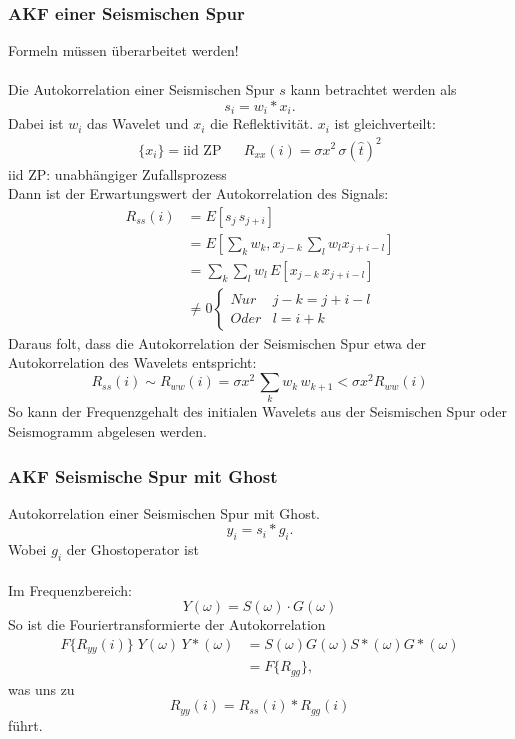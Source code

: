 \subsubsection*{AKF einer Seismischen Spur}
{\color{red}Formeln müssen überarbeitet werden!}\\\\
Die Autokorrelation einer Seismischen Spur $s$ kann betrachtet werden als
\[
s_i = w_i * x_i.
\]
{\small Dabei ist $w_i$ das Wavelet und $x_i$ die Reflektivität.}
$x_i$ ist gleichverteilt:
\begin{align*}
\{x_i\} = \mbox{iid ZP} & & R_{xx}(i) = \sigma x^2 \, \sigma(\hat{t})^2
\end{align*}
{\small iid ZP: unabhängiger Zufallsprozess}\\
Dann ist der Erwartungswert der Autokorrelation des Signals:
\begin{align*}
R_{ss}(i) & = E[s_j\, s_{j+i}]\\
& = E\left[\sum_k w_k, x_{j-k}\, \sum_l w_l x_{j+i-l}\right]\\
& = \sum_k \sum_l w_l\,E[x_{j-k}\,x_{j+i-l}]\\
& \not= 0
\begin{cases}
Nur & j-k = j+i-l\\
Oder & l = i+k
\end{cases}
\end{align*}
Daraus folt, dass die Autokorrelation der Seismischen Spur etwa der Autokorrelation des Wavelets entspricht:
\[
R_{ss}(i) \sim R_{ww}(i) = \sigma x^2 \, \sum_k w_k \, w_{k+1} < \sigma x^2 R_{ww}(i)
\]
So kann der Frequenzgehalt des initialen Wavelets aus der Seismischen Spur oder Seismogramm abgelesen werden.

\subsubsection*{AKF Seismische Spur mit Ghost}
Autokorrelation einer Seismischen Spur mit Ghost.
\[
y_i = s_i * g_i.
\]
{\small Wobei $g_i$ der Ghostoperator ist}\\\\
Im Frequenzbereich:
\[
Y(\omega) = S(\omega) \cdot G(\omega)
\]
So ist die Fouriertransformierte der Autokorrelation
\begin{align*}
F\{R_{yy}(i)\}\;Y(\omega)\,Y*(\omega) & = S(\omega) G(\omega) S*(\omega) G*(\omega)\\
& = F\{R_{gg}\},
\end{align*}
was uns zu
\[
R_{yy}(i) = R_{ss}(i)*R_{gg}(i)
\]
führt.
